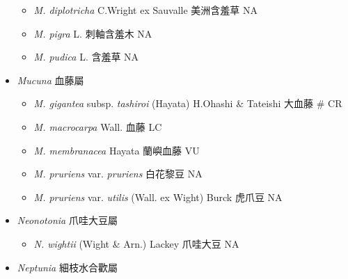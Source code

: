 \begin{itemize}
  \begin{itemize}
        \item[] \textit{M. diplotricha} C.Wright ex Sauvalle  美洲含羞草   NA
        \item[] \textit{M. pigra} L.  刺軸含羞木   NA
        \item[] \textit{M. pudica} L.  含羞草   NA
  \end{itemize}
 \item[] \textit{Mucuna} 血藤屬
                                
  \begin{itemize}
        \item[] \textit{M. gigantea} subsp. \textit{tashiroi} (Hayata) H.Ohashi \& Tateishi  大血藤  \# CR
        \item[] \textit{M. macrocarpa} Wall.  血藤   LC
        \item[] \textit{M. membranacea} Hayata  蘭嶼血藤   VU
        \item[] \textit{M. pruriens} var. \textit{pruriens}   白花黎豆   NA
        \item[] \textit{M. pruriens} var. \textit{utilis} (Wall. ex Wight) Burck  虎爪豆   NA
  \end{itemize}
 \item[] \textit{Neonotonia} 爪哇大豆屬
                                
  \begin{itemize}
        \item[] \textit{N. wightii} (Wight \& Arn.) Lackey  爪哇大豆   NA
  \end{itemize}
 \item[] \textit{Neptunia} 細枝水合歡屬
                                

\end{itemize}
